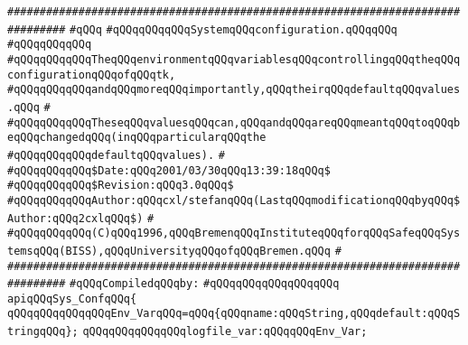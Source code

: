 \label{src/lib/tk/src/sys_conf.pkg}
\verb|###############################################################################|\newline
\verb|#qQQq|\newline
\verb|#qQQqqQQqqQQqSystemqQQqconfiguration.qQQqqQQq|\newline
\verb|#qQQqqQQqqQQq|\newline
\verb|#qQQqqQQqqQQqTheqQQqenvironmentqQQqvariablesqQQqcontrollingqQQqtheqQQqconfigurationqQQqofqQQqtk,|\newline
\verb|#qQQqqQQqqQQqandqQQqmoreqQQqimportantly,qQQqtheirqQQqdefaultqQQqvalues.qQQq|\newline
\verb|#|\newline
\verb|#qQQqqQQqqQQqTheseqQQqvaluesqQQqcan,qQQqandqQQqareqQQqmeantqQQqtoqQQqbeqQQqchangedqQQq(inqQQqparticularqQQqthe|\newline
\verb|#qQQqqQQqqQQqdefaultqQQqvalues).|\newline
\verb|#|\newline
\verb|#qQQqqQQqqQQq$Date:qQQq2001/03/30qQQq13:39:18qQQq$|\newline
\verb|#qQQqqQQqqQQq$Revision:qQQq3.0qQQq$|\newline
\verb|#qQQqqQQqqQQqAuthor:qQQqcxl/stefanqQQq(LastqQQqmodificationqQQqbyqQQq$Author:qQQq2cxlqQQq$)|\newline
\verb|#|\newline
\verb|#qQQqqQQqqQQq(C)qQQq1996,qQQqBremenqQQqInstituteqQQqforqQQqSafeqQQqSystemsqQQq(BISS),qQQqUniversityqQQqofqQQqBremen.qQQq|\newline
\verb|#|\newline
\verb|###############################################################################|\newline
\newline
\verb|#qQQqCompiledqQQqby:|\newline
\verb|#qQQqqQQqqQQqqQQqqQQq|\newline
\newline
\newline
\newline
\verb|apiqQQqSys_ConfqQQq{|\newline
\newline
\verb|qQQqqQQqqQQqqQQqEnv_VarqQQq=qQQq{qQQqname:qQQqString,qQQqdefault:qQQqStringqQQq};|\newline
\newline
\verb|qQQqqQQqqQQqqQQqlogfile_var:qQQqqQQqEnv_Var;|\newline
